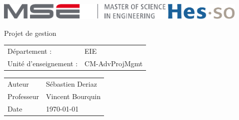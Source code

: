 \documentclass[]{article}
\newcommand{\Author}{Sébastien Deriaz}
\newcommand{\professor}{Vincent Bourquin}
\newcommand{\cours}{CM-AdvProjMgmt}
\newcommand{\titre}{Projet de gestion}
\begin{document}
\thispagestyle{empty}

\begin{center}
\includegraphics[height=8mm]{mse-full-cropped.pdf}
\hfill
\includegraphics[height=8mm]{HES-SO_logo_Pantone.pdf}
\end{center}
\vfill
\begin{center}
\Huge \titre
\end{center}
\begin{center}
\large
\begin{tabular}{ll}
Département : & EIE\\
Unité d'enseignement : & \cours
\end{tabular}
\end{center}
\vfill
\begin{center}
\large
\begin{tabular}{ll}
\Large Auteur & \Large \Author\\
Professeur & \professor\\ 
Date & \today
\end{tabular}
\end{center}
\vfill

\pagebreak
\tableofcontents
\pagebreak

\end{document}
